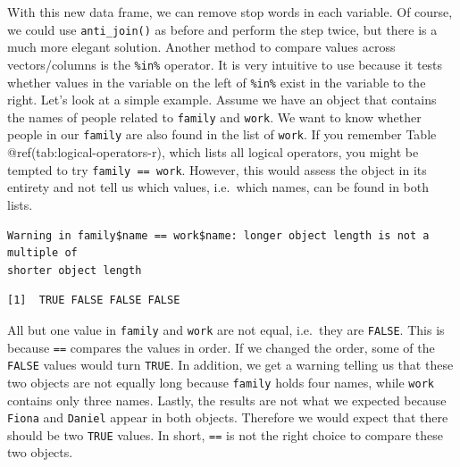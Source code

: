 \documentclass[
  letterpaper,
]{krantz}
\makeatletter
\newenvironment{Shaded}{\begin{snugshade}}{\end{snugshade}}
\newcommand{\AttributeTok}[1]{\textcolor[rgb]{0.40,0.45,0.13}{#1}}
\newcommand{\CommentTok}[1]{\textcolor[rgb]{0.37,0.37,0.37}{#1}}
\newcommand{\FunctionTok}[1]{\textcolor[rgb]{0.28,0.35,0.67}{#1}}
\newcommand{\NormalTok}[1]{\textcolor[rgb]{0.00,0.23,0.31}{#1}}
\newcommand{\OtherTok}[1]{\textcolor[rgb]{0.00,0.23,0.31}{#1}}
\newcommand{\SpecialCharTok}[1]{\textcolor[rgb]{0.37,0.37,0.37}{#1}}
\newcommand{\StringTok}[1]{\textcolor[rgb]{0.13,0.47,0.30}{#1}}
\newenvironment{kframe}{%
\medskip{}
\setlength{\fboxsep}{.8em}
 \def\at@end@of@kframe{}%
 \ifinner\ifhmode%
  \def\at@end@of@kframe{\end{minipage}}%
  \begin{minipage}{\columnwidth}%
 \fi\fi%
 \def\FrameCommand##1{\hskip\@totalleftmargin \hskip-\fboxsep
 \colorbox{shadecolor}{##1}\hskip-\fboxsep
     \hskip-\linewidth \hskip-\@totalleftmargin \hskip\columnwidth}%
 \MakeFramed {\advance\hsize-\width
   \@totalleftmargin\z@ \linewidth\hsize
   \@setminipage}}%
 {\par\unskip\endMakeFramed%
 \at@end@of@kframe}
\renewenvironment{Shaded}{\begin{kframe}}{\end{kframe}}
\makeatother
\begin{document}
With this new data frame, we can remove stop words in each variable. Of
course, we could use \texttt{anti\_join()} as before and perform the
step twice, but there is a much more elegant solution. Another method to
compare values across vectors/columns is the \texttt{\%in\%} operator.
It is very intuitive to use because it tests whether values in the
variable on the left of \texttt{\%in\%} exist in the variable to the
right. Let's look at a simple example. Assume we have an object that
contains the names of people related to \texttt{family} and
\texttt{work}. We want to know whether people in our \texttt{family} are
also found in the list of \texttt{work}. If you remember Table
@ref(tab:logical-operators-r), which lists all logical operators, you
might be tempted to try \texttt{family\ ==\ work}. However, this would
assess the object in its entirety and not tell us which values,
i.e.~which names, can be found in both lists.

\begin{Shaded}
\end{Shaded}

\begin{verbatim}
Warning in family$name == work$name: longer object length is not a multiple of
shorter object length
\end{verbatim}

\begin{verbatim}
[1]  TRUE FALSE FALSE FALSE
\end{verbatim}

All but one value in \texttt{family} and \texttt{work} are not equal,
i.e.~they are \texttt{FALSE}. This is because \texttt{==} compares the
values in order. If we changed the order, some of the \texttt{FALSE}
values would turn \texttt{TRUE}. In addition, we get a warning telling
us that these two objects are not equally long because \texttt{family}
holds four names, while \texttt{work} contains only three names. Lastly,
the results are not what we expected because \texttt{Fiona} and
\texttt{Daniel} appear in both objects. Therefore we would expect that
there should be two \texttt{TRUE} values. In short, \texttt{==} is not
the right choice to compare these two objects.
\end{document}
